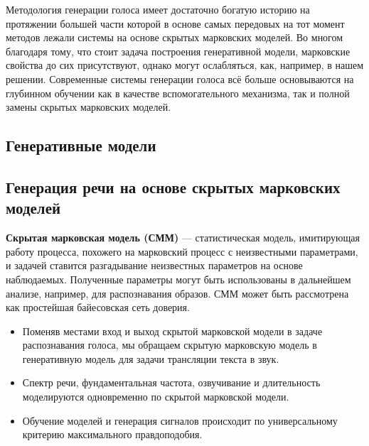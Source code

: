 \documentclass[../diploma.tex]{subfiles}
\begin{document}
\label{sec:existing_solutions}
   
Методология генерации голоса имеет достаточно богатую историю на протяжении большей части которой в основе самых передовых на тот момент методов лежали системы на основе скрытых марковских моделей.
Во многом благодаря тому, что стоит задача построения генеративной модели, марковские свойства до сих присутствуют, однако могут ослабляться, как, например, в нашем решении. 
Современные системы генерации голоса всё больше основываются на глубинном обучении как в качестве вспомогательного механизма, так и полной замены скрытых марковских моделей.

\subsection{Генеративные модели}



\subsection{Генерация речи на основе скрытых марковских моделей}

\begin{definition}
\textbf{Скрытая марковская модель (СММ)} — статистическая модель, имитирующая работу процесса, похожего на марковский процесс с неизвестными параметрами, и задачей ставится разгадывание неизвестных параметров на основе наблюдаемых. Полученные параметры могут быть использованы в дальнейшем анализе, например, для распознавания образов. СММ может быть рассмотрена как простейшая байесовская сеть доверия.
    \cite{wiki:hmm}
\end{definition}

% 

     
\begin{itemize}
    \item Поменяв местами вход и выход скрытой марковской модели в задаче распознавания голоса, мы обращаем скрытую марковскую модель в генеративную модель для задачи трансляции текста в звук.
    \item Спектр речи, фундаментальная частота, озвучивание и длительность моделируются одновременно по скрытой марковской модели. \cite{yoshimura1999simultaneous}
    \item Обучение моделей и генерация сигналов происходит по универсальному критерию максимального правдоподобия.
\end{itemize}
\cite{tokuda2002hmm}
\end{document}
